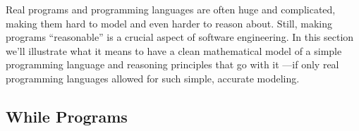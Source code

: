 
\label{while_chap}

\def\movesto{\mathrel{\longrightarrow}}
\newcommand{\while}{\text{\textbf{while}}}
\newcommand{\docomm}{\text{\textbf{do}}}
\newcommand{\odcomm}{\text{\textbf{od}}}
\newcommand{\wloop}[2]{\while\ #1\ \docomm\ #2\ \odcomm}
\newcommand{\assigned}{\mathbin{\mathtt{:=}}}
\newcommand{\condif}{\text{\textbf{if}}}
\newcommand{\condthen}{\text{\textbf{then}}}
\newcommand{\condelse}{\text{\textbf{else}}}
\newcommand{\condcomm}[3]{\condif\ #1\ \condthen\ #2\ \condelse\ #3}
\newcommand{\seqcomm}[2]{#1\mathbf{;}#2}
\newcommand{\Env}{\text{Env}}
\newcommand{\halt}{\text{\textbf{Done}}}
\newcommand{\state}[2]{\ang{#1,\, #2}}
\newcommand{\step}[4]{\state{#1}{#2} \movesto \state{#3}{#4}}
\newcommand{\haltswith}[3]{\state{#1}{#2}\movesto^*  \state{\halt}{#3}}
\newcommand{\after}[3]{#1 \: \set{#2}\: #3}

Real programs and programming languages are often huge and complicated,
making them hard to model and even harder to reason about.  Still, making
programs ``reasonable'' is a crucial aspect of software engineering.  In
this section we'll illustrate what it means to have a clean mathematical
model of a simple programming language and reasoning principles that go
with it ---if only real programming languages allowed for such simple,
accurate modeling.

\subsection{\textbf{While} Programs}

